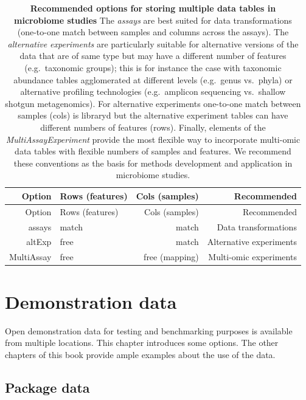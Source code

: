 \documentclass[
]{book}
\begin{document}
\begin{longtable}[]{@{}rlrr@{}}
\caption{\label{tab:options} \textbf{Recommended options for storing multiple data tables in microbiome studies} The \emph{assays} are best suited for data transformations (one-to-one match between samples and columns across the assays). The \emph{alternative experiments} are particularly suitable for alternative versions of the data that are of same type but may have a different number of features (e.g.~taxonomic groups); this is for instance the case with taxonomic abundance tables agglomerated at different levels (e.g.~genus vs.~phyla) or alternative profiling technologies (e.g.~amplicon sequencing vs.~shallow shotgun metagenomics). For alternative experiments one-to-one match between samples (cols) is libraryd but the alternative experiment tables can have different numbers of features (rows). Finally, elements of the \emph{MultiAssayExperiment} provide the most flexible way to incorporate multi-omic data tables with flexible numbers of samples and features. We recommend these conventions as the basis for methods development and application in microbiome studies.}\tabularnewline
\toprule()
Option & Rows (features) & Cols (samples) & Recommended \\
\midrule()
\endfirsthead
\toprule()
Option & Rows (features) & Cols (samples) & Recommended \\
\midrule()
\endhead
assays & match & match & Data transformations \\
altExp & free & match & Alternative experiments \\
MultiAssay & free & free (mapping) & Multi-omic experiments \\
\bottomrule()
\end{longtable}

\hypertarget{example-data}{%
\section{Demonstration data}\label{example-data}}

Open demonstration data for testing and benchmarking purposes is
available from multiple locations. This chapter introduces some
options. The other chapters of this book provide ample examples about
the use of the data.

\hypertarget{package-data}{%
\subsection{Package data}\label{package-data}}
\end{document}

